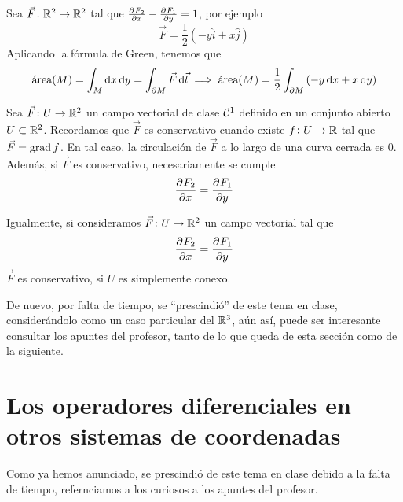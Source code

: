 \begin{example}
    Sea $\vec{F} \colon \mathbb{R}^2 \to \mathbb{R}^2$ tal que $\frac{\partial^{} F_2}{\partial x^{}} - \frac{\partial^{} F_1}{\partial y^{}} = 1$, por ejemplo
    \[
        \vec{F} = \frac{1}{2} \left( -y \hat{i} + x \hat{j} \right)
    \]
    Aplicando la fórmula de Green, tenemos que
    \[
        \text{área}(M) = \int_M \dif x \dif y = \int_{\partial M} \vec{F} \dif \vec{l} \implies
        \text{área}(M) = \frac{1}{2} \int_{\partial M} \left( -y \dif x + x \dif y \right)
    \]
\end{example}

\begin{prop}
    Sea $\vec{F} \colon U \to \mathbb{R}^2$ un campo vectorial de clase $\mathcal{C}^1$ definido en un conjunto abierto $U \subset \mathbb{R}^2$.
    Recordamos que $\vec{F}$ es conservativo cuando existe $f \colon U \to \mathbb{R}$ tal que $\vec{F} = \operatorname{grad} f$. En tal caso, la
    circulación de $\vec{F}$ a lo largo de una curva cerrada es 0. Además, si $\vec{F}$ es conservativo, necesariamente se cumple
    \[
        \frac{\partial^{} F_2}{\partial x^{}} = \frac{\partial^{} F_1}{\partial y^{}}
    \]
\end{prop}

\begin{prop}
    Igualmente, si consideramos $\vec{F} \colon U \to \mathbb{R}^2$ un campo vectorial tal que
    \[
        \frac{\partial^{} F_2}{\partial x^{}} = \frac{\partial^{} F_1}{\partial y^{}}
    \]
    $\vec{F}$ es conservativo, si $U$ es simplemente conexo.
\end{prop}


De nuevo, por falta de tiempo, se ``prescindió'' de este tema en clase, considerándolo como un caso particular del $\mathbb{R}^3$, aún
así, puede ser interesante consultar los apuntes del profesor, tanto de lo que queda de esta sección como de la siguiente.

\section{Los operadores diferenciales en otros sistemas de coordenadas}

Como ya hemos anunciado, se prescindió de este tema en clase debido a la falta de tiempo, refernciamos a los curiosos a los apuntes del
profesor.
